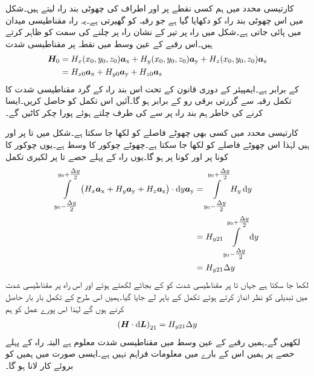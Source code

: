 کارتیسی محدد میں ہم کسی نقطے  پر   اور  اطراف کی چھوٹی بند راہ لیتے ہیں۔شکل  میں اس چھوٹی بند راہ کو دکھایا گیا ہے جو رقبہ  کو گھیرتی ہے۔یہ راہ مقناطیسی میدان  میں پائی جاتی ہے۔شکل میں راہ پر تیر کے نشان راہ پر چلنے کی سمت کو ظاہر کرتے  ہیں۔اس رقبے کے عین وسط میں نقطہ  پر مقناطیسی شدت 
\begin{align*}
{\ensuremath{{\boldsymbol{H}}}}_0&=H_x(x_0,y_0,z_0){\boldsymbol{a}}_{\textup{x}}+H_y(x_0,y_0,z_0){\boldsymbol{a}}_{\textup{y}}+H_z(x_0,y_0,z_0){\boldsymbol{a}}_{\textup{z}}\\
&=H_{x0}{\boldsymbol{a}}_{\textup{x}}+H_{y0}{\boldsymbol{a}}_{\textup{y}}+H_{z0}{\boldsymbol{a}}_{\textup{z}}
\end{align*}
کے برابر ہے۔ایمپیئر کے دوری قانون کے تحت اس بند راہ کے گرد مقناطیسی شدت کا تکمل رقبہ  سے گزرتی برقی رو کے برابر ہو گا۔آئیں اس تکمل کو حاصل کریں۔ایسا کرنے کی خاطر ہم بند راہ پر سے  کی طرف چلتے ہوئے پورا چکر کاٹیں گے۔

کارتیسی محدد میں کسی بھی چھوٹے فاصلے کو  لکھا جا سکتا ہے۔شکل  میں  تا  پر  اور  ہیں لہٰذا اس چھوٹے فاصلے کو  لکھا جا سکتا ہے۔چھوٹے چوکور کا وسط  ہے۔یوں چوکور کا  کونا  پر اور  کونا  پر ہو گا۔یوں راہ کے پہلے حصے  تا  پر لکیری تکمل
\begin{align*}
\int\limits_{y_0-\tfrac{\Delta y}{2}}^{y_0+\tfrac{\Delta y}{2}}\left(H_x \ax+H_y\ay+H_z\az \right) \cdot \dif y \ay&=\int\limits_{y_0-\tfrac{\Delta y}{2}}^{y_0+\tfrac{\Delta y}{2}}H_y  \dif y \\
&=H_{y21}\int\limits_{y_0-\tfrac{\Delta y}{2}}^{y_0+\tfrac{\Delta y}{2}}  \dif y \\
&=H_{y21}\Delta y
\end{align*}
لکھا جا سکتا ہے جہاں  تا  پر مقناطیسی شدت کو  کے بجائے  لکھتے ہوئے اور اس راہ پر مقناطیسی شدت میں تبدیلی کو نظر انداز کرتے ہوئے  تکمل کے باہر لے جایا گیا۔ہمیں اس طرح کے تکمل بار بار حاصل کرنے ہوں گے لہٰذا اس پورے عمل کو ہم
\begin{align}\label{مساوات_مقناطیسی_پہلے_حصہ_تکمل}
\left( \kvec{H} \cdot \dif \kvec{L}\right)_{21}=H_{y21} \Delta y 
\end{align}
لکھیں گے۔ہمیں رقبے کے عین وسط میں مقناطیسی شدت معلوم ہے البتہ راہ کے پہلے حصے پر ہمیں اس کے بارے میں معلومات فراہم نہیں ہے۔ایسی صورت میں ہمیں  کو بروئے کار لانا ہو گا۔

